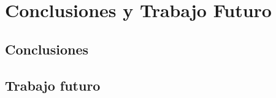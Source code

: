 \chapter{Conclusiones y Trabajo Futuro} \label{Capítulo 5}



\section{Conclusiones} \label{Subsec: 5_1}



\section{Trabajo futuro} \label{Subsec: 5_2}